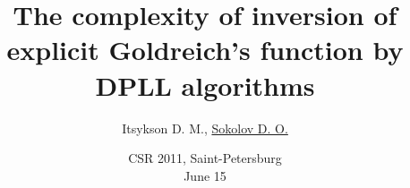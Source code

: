

\title[\insertframenumber/\inserttotalframenumber~|~
Inversion Goldreich's function]{The complexity of inversion of
	explicit Goldreich's function by DPLL algorithms}
\author[Sokolov D. O.]{Itsykson D. M., \underline{Sokolov D. O.}}


\date{CSR 2011, Saint-Petersburg \\
	June 15}



	\maketitle

	



